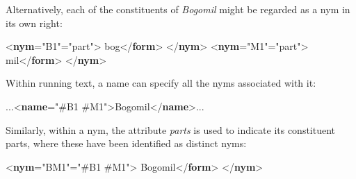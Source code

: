 Alternatively, each of the constituents of \textit{Bogomil} might be regarded as a nym in its own right: \par\bgroup{}\exampleFont \begin{shaded}\noindent\mbox{}{<\textbf{nym}\hspace*{1em}{xml:id}="{B1}"\hspace*{1em}{type}="{part}">}\mbox{}\newline 
{}bog{</\textbf{form}>}\mbox{}\newline 
{</\textbf{nym}>}\mbox{}\newline 
{<\textbf{nym}\hspace*{1em}{xml:id}="{M1}"\hspace*{1em}{type}="{part}">}\mbox{}\newline 
{}mil{</\textbf{form}>}\mbox{}\newline 
{</\textbf{nym}>}\end{shaded}\egroup\par \noindent  Within running text, a name can specify all the nyms associated with it: \par\bgroup{}\exampleFont \begin{shaded}\noindent\mbox{} ...{<\textbf{name}\hspace*{1em}{nymRef}="{\#B1 \#M1}">}Bogomil{</\textbf{name}>}... \end{shaded}\egroup\par \noindent  Similarly, within a nym, the attribute {\itshape parts} is used to indicate its constituent parts, where these have been identified as distinct nyms: \par\bgroup{}\exampleFont \begin{shaded}\noindent\mbox{}{<\textbf{nym}\hspace*{1em}{xml:id}="{BM1}"\hspace*{1em}{parts}="{\#B1 \#M1}">}\mbox{}\newline 
{}Bogomil{</\textbf{form}>}\mbox{}\newline 
{</\textbf{nym}>}\end{shaded}\egroup\par \par

